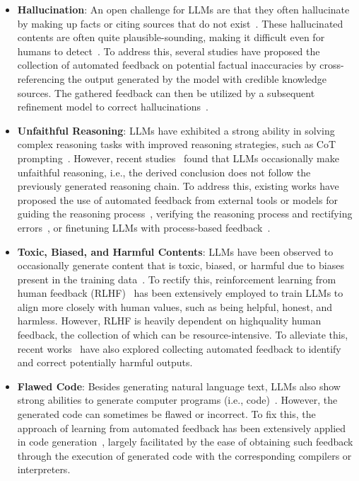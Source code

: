 \documentclass[a4paper,oneside]{book}
\begin{document}
\begin{itemize}
    \item \textbf{Hallucination}: An open challenge for LLMs are that they often hallucinate by making up facts or citing sources that do not exist~\cite{li2023halueval, zhang2023language}. These hallucinated contents are often quite plausible-sounding, making it difficult even for humans to detect~\cite{clark2021thats}. To address this, several studies have proposed the collection of automated feedback on potential factual inaccuracies by cross-referencing the output generated by the model with credible knowledge sources. The gathered feedback can then be utilized by a subsequent refinement model to correct hallucinations~\cite{gao2023rarr, zhang2023language}.

    \item \textbf{Unfaithful Reasoning}: LLMs have exhibited a strong ability in solving complex reasoning tasks with improved reasoning strategies, such as CoT prompting~\cite{wei2023chainofthought}. However, recent studies~\cite{golovneva2023roscoe, ribeiro2023street, lyu2023faithful} found that LLMs occasionally make unfaithful reasoning, i.e., the derived conclusion does not follow the previously generated reasoning chain. To address this, existing works have proposed the use of automated feedback from external tools or models for guiding the reasoning process~\cite{xie2023selfevaluation, yao2023tree}, verifying the reasoning process and rectifying errors~\cite{he2022rethinking, pan2023logiclm}, or finetuning LLMs with process-based feedback~\cite{huang2022large, lightman2023lets}.

    \item \textbf{Toxic, Biased, and Harmful Contents}: LLMs have been observed to occasionally generate content that is toxic, biased, or harmful due to biases present in the training data~\cite{shaikh-etal-2023-second}. To rectify this, reinforcement learning from human feedback (RLHF)~\cite{ouyang2022training, bai2022training} has been extensively employed to train LLMs to align more closely with human values, such as being helpful, honest, and harmless. However, RLHF is heavily dependent on highquality human feedback, the collection of which can be resource-intensive. To alleviate this, recent works~\cite{lu2022quark, gou2023critic} have also explored collecting automated feedback to identify and correct potentially harmful outputs.

    \item \textbf{Flawed Code}: Besides generating natural language text, LLMs also show strong abilities to generate computer programs (i.e., code)~\cite{chen2022codet}. However, the generated code can sometimes be flawed or incorrect. To fix this, the approach of learning from automated feedback has been extensively applied in code generation~\cite{chen2023teaching, olausson2023selfrepair}, largely facilitated by the ease of obtaining such feedback through the execution of generated code with the corresponding compilers or interpreters.
\end{itemize}
\end{document}
